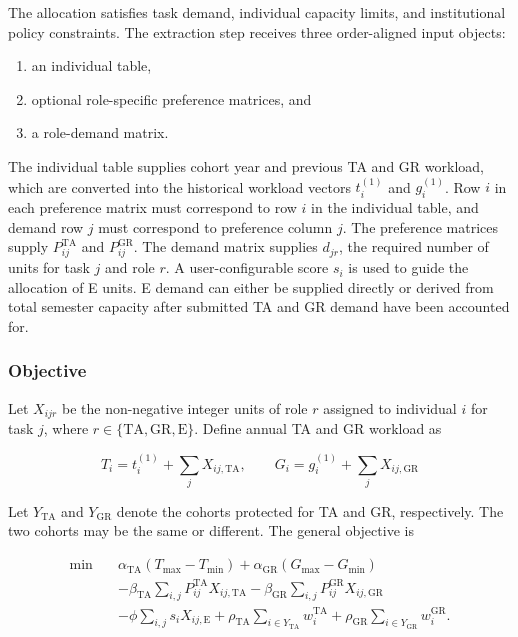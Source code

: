 The allocation satisfies task demand, individual capacity limits, and institutional
policy constraints. The extraction step receives three order-aligned input objects:

\begin{enumerate}
\def\labelenumi{\arabic{enumi}.}
\tightlist
\item
  an individual table,
\item
  optional role-specific preference matrices, and
\item
  a role-demand matrix.
\end{enumerate}

The individual table supplies cohort year and previous TA and GR workload,
which are converted into the historical workload vectors \(t_i^{(1)}\) and
\(g_i^{(1)}\). Row \(i\) in each preference matrix must correspond to row
\(i\) in the individual table, and demand row \(j\) must correspond to
preference column \(j\). The preference matrices supply
\(P^{\mathrm{TA}}_{ij}\) and \(P^{\mathrm{GR}}_{ij}\). The demand matrix
supplies \(d_{jr}\), the required number of units for task \(j\) and role
\(r\). A user-configurable score \(s_i\) is used to guide the allocation of E
units. E demand can either be supplied directly or derived from total semester
capacity after submitted TA and GR demand have been accounted for.

\subsubsection{Objective}\label{objective-2}

Let \(X_{ijr}\) be the non-negative integer units of role \(r\) assigned to
individual \(i\) for task \(j\), where
\(r\in\{\mathrm{TA},\mathrm{GR},\mathrm{E}\}\). Define annual TA and GR
workload as

\[
T_i=t_i^{(1)}+\sum_jX_{ij,\mathrm{TA}},\qquad
G_i=g_i^{(1)}+\sum_jX_{ij,\mathrm{GR}}
\]

Let \(Y_{\mathrm{TA}}\) and \(Y_{\mathrm{GR}}\) denote the cohorts protected
for TA and GR, respectively. The two cohorts may be the same or different. The
general objective is

\[
\begin{aligned}
\min\quad
&\alpha_{\mathrm{TA}}(T_{\max}-T_{\min})
+\alpha_{\mathrm{GR}}(G_{\max}-G_{\min})\\
&-\beta_{\mathrm{TA}}\sum_{i,j}
P^{\mathrm{TA}}_{ij}X_{ij,\mathrm{TA}}
-\beta_{\mathrm{GR}}\sum_{i,j}
P^{\mathrm{GR}}_{ij}X_{ij,\mathrm{GR}}\\
&-\phi\sum_{i,j}s_iX_{ij,\mathrm{E}}
+\rho_{\mathrm{TA}}\sum_{i\in Y_{\mathrm{TA}}}w_i^{\mathrm{TA}}
+\rho_{\mathrm{GR}}\sum_{i\in Y_{\mathrm{GR}}}w_i^{\mathrm{GR}}.
\end{aligned}
\]

